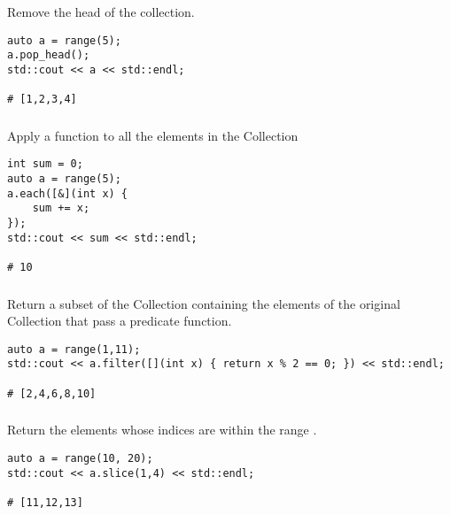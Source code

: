 Remove the head of the collection.

\begin{lstlisting}[title=example]
auto a = range(5);
a.pop_head();
std::cout << a << std::endl;

# [1,2,3,4]
\end{lstlisting}




\subsubsection{}

Apply a function to all the elements in the Collection

\begin{lstlisting}[title=example]
int sum = 0;
auto a = range(5);
a.each([&](int x) {
    sum += x;
});
std::cout << sum << std::endl;

# 10
\end{lstlisting}




\subsubsection{}

Return a subset of the Collection containing the elements of the original Collection that pass a predicate function.

\begin{lstlisting}[title=example]
auto a = range(1,11);
std::cout << a.filter([](int x) { return x % 2 == 0; }) << std::endl;

# [2,4,6,8,10]
\end{lstlisting}




\subsubsection{}

Return the elements whose indices are within the range \code{[low, high)}.

\begin{lstlisting}[title=example]
auto a = range(10, 20);
std::cout << a.slice(1,4) << std::endl;

# [11,12,13]
\end{lstlisting}





